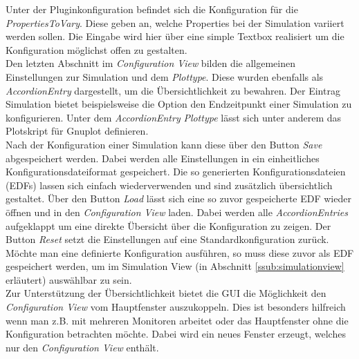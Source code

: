 \documentclass[a4paper, 11pt]{article} %
\begin{document}
 Unter der Pluginkonfiguration befindet sich die Konfiguration für die \emph{PropertiesToVary}. Diese geben an, welche Properties bei der Simulation variiert werden sollen. Die Eingabe wird hier über eine simple Textbox realisiert um die Konfiguration möglichst offen zu gestalten. \\

 Den letzten Abschnitt im \emph{Configuration View} bilden die allgemeinen Einstellungen zur Simulation und dem \emph{Plottype}. Diese wurden ebenfalls als \emph{AccordionEntry} dargestellt, um die Übersichtlichkeit zu bewahren. Der Eintrag Simulation bietet beispielsweise die Option den Endzeitpunkt einer Simulation zu konfigurieren. Unter dem \emph{AccordionEntry} \emph{Plottype} lässt sich unter anderem das Plotskript für Gnuplot definieren.\\

 Nach der Konfiguration einer Simulation kann diese über den Button \emph{Save} abgespeichert werden. Dabei werden alle Einstellungen in ein einheitliches Konfigurationsdateiformat gespeichert. Die so generierten Konfigurationsdateien (EDFs) lassen sich einfach wiederverwenden und sind zusätzlich übersichtlich gestaltet. Über den Button \emph{Load} lässt sich eine so zuvor gespeicherte EDF wieder öffnen und in den \emph{Configuration View} laden. Dabei werden alle \emph{AccordionEntries} aufgeklappt um eine direkte Übersicht über die Konfiguration zu zeigen. Der Button \emph{Reset} setzt die Einstellungen auf eine Standardkonfiguration zurück. Möchte man eine definierte Konfiguration ausführen, so muss diese zuvor als EDF gespeichert werden, um im Simulation View (in Abschnitt \ref{ssub:simulationview} erläutert) auswählbar zu sein.\\

 Zur Unterstützung der Übersichtlichkeit bietet die GUI die Möglichkeit den \emph{Configuration View} vom Hauptfenster auszukoppeln. Dies ist besonders hilfreich wenn man z.B. mit mehreren Monitoren arbeitet oder das Hauptfenster ohne die Konfiguration betrachten möchte. Dabei wird ein neues Fenster erzeugt, welches nur den \emph{Configuration View} enthält.
\end{document}
